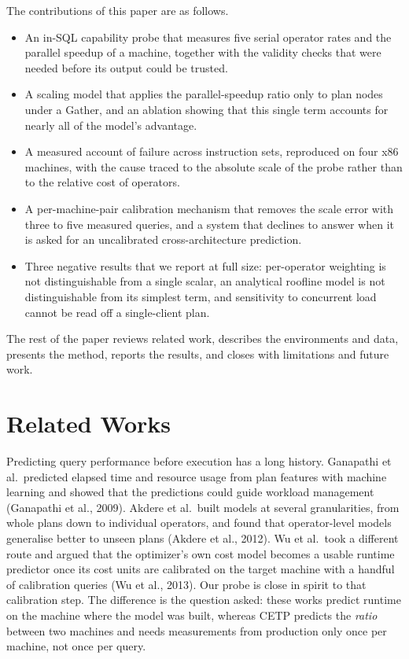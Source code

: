\documentclass[runningheads]{llncs}
\begin{document}
The contributions of this paper are as follows.
\begin{itemize}
\item An in-SQL capability probe that measures five serial operator rates and
the parallel speedup of a machine, together with the validity checks that
were needed before its output could be trusted.
\item A scaling model that applies the parallel-speedup ratio only to plan
nodes under a Gather, and an ablation showing that this single term accounts
for nearly all of the model's advantage.
\item A measured account of failure across instruction sets, reproduced on
four x86 machines, with the cause traced to the absolute scale of the probe
rather than to the relative cost of operators.
\item A per-machine-pair calibration mechanism that removes the scale error
with three to five measured queries, and a system that declines to answer
when it is asked for an uncalibrated cross-architecture prediction.
\item Three negative results that we report at full size: per-operator
weighting is not distinguishable from a single scalar, an analytical roofline
model is not distinguishable from its simplest term, and sensitivity to
concurrent load cannot be read off a single-client plan.
\end{itemize}

The rest of the paper reviews related work, describes the environments and
data, presents the method, reports the results, and closes with limitations
and future work.

\section{Related Works}

Predicting query performance before execution has a long history. Ganapathi
et al.\ predicted elapsed time and resource usage from plan features with
machine learning and showed that the predictions could guide workload
management (Ganapathi et al., 2009). Akdere et al.\ built models at several
granularities, from whole plans down to individual operators, and found that
operator-level models generalise better to unseen plans (Akdere et al., 2012).
Wu et al.\ took a different route and argued that the optimizer's own cost
model becomes a usable runtime predictor once its cost units are calibrated on
the target machine with a handful of calibration queries (Wu et al., 2013).
Our probe is close in spirit to that calibration step. The difference is the
question asked: these works predict runtime on the machine where the model
was built, whereas CETP predicts the \emph{ratio} between two machines and
needs measurements from production only once per machine, not once per query.
\end{document}
